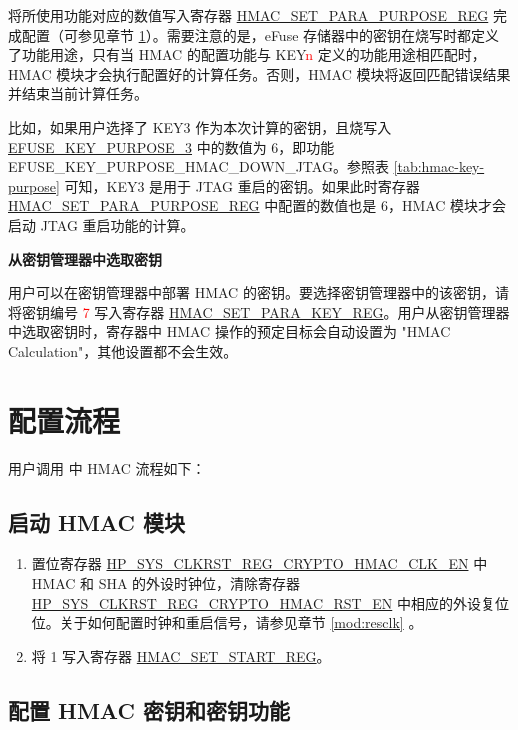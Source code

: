 \documentclass[main\_\_CN.tex]{subfiles}
\begin{document}
将所使用功能对应的数值写入寄存器 \hyperref[regdesc:HMACSETPARAPURPOSEREG]{HMAC\_SET\_PARA\_PURPOSE\_REG} 完成配置（可参见章节 \ref{sec:hmac-process-detailed}）。需要注意的是，eFuse 存储器中的密钥在烧写时都定义了功能用途，只有当 HMAC 的配置功能与 KEY\textcolor{red}{n} 定义的功能用途相匹配时，HMAC 模块才会执行配置好的计算任务。否则，HMAC 模块将返回匹配错误结果并结束当前计算任务。

比如，如果用户选择了 KEY3 作为本次计算的密钥，且烧写入 \hyperref[fielddesc:EFUSEKEYPURPOSE3]{EFUSE\_KEY\_PURPOSE\_3} 中的数值为 6，即功能 EFUSE\_KEY\_PURPOSE\_HMAC\_DOWN\_JTAG。参照表 \ref{tab:hmac-key-purpose} 可知，KEY3 是用于 JTAG 重启的密钥。如果此时寄存器 \hyperref[regdesc:HMACSETPARAPURPOSEREG]{HMAC\_SET\_PARA\_PURPOSE\_REG} 中配置的数值也是 6，HMAC 模块才会启动 JTAG 重启功能的计算。

\textbf{从密钥管理器中选取密钥}
\label{sec:hmac-config-km-key}

用户可以在密钥管理器中部署 HMAC 的密钥。要选择密钥管理器中的该密钥，请将密钥编号 \textcolor{red}{7} 写入寄存器 \hyperref[regdesc:HMACSETPARAKEYREG]{HMAC\_SET\_PARA\_KEY\_REG}。用户从密钥管理器中选取密钥时，寄存器中 HMAC 操作的预定目标会自动设置为 "HMAC Calculation"，其他设置都不会生效。

\section{配置流程}
\label{sec:hmac-process-detailed}

用户调用 \chipname{} 中 HMAC 流程如下：

\subsection{启动 HMAC 模块}
\label{sec:hmac-enable-module}

    \begin{enumerate}
        \item 置位寄存器 \hyperref[fielddesc:HPSYSCLKRSTREGCRYPTOHMACCLKEN]{HP\_SYS\_CLKRST\_REG\_CRYPTO\_HMAC\_CLK\_EN} 中 HMAC 和 SHA 的外设时钟位，清除寄存器 \hyperref[fielddesc:HPSYSCLKRSTREGCRYPTOHMACRSTEN]{HP\_SYS\_CLKRST\_REG\_CRYPTO\_HMAC\_RST\_EN} 中相应的外设复位位。关于如何配置时钟和重启信号，请参见章节 \ref{mod:resclk} \textit{}。
        \item 将 1 写入寄存器 \hyperref[regdesc:HMACSETSTARTREG]{HMAC\_SET\_START\_REG}。
    \end{enumerate}

\subsection{配置 HMAC 密钥和密钥功能}
\end{document}

